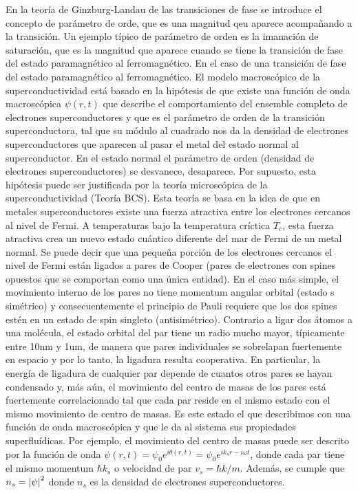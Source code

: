 En la teoría de Ginzburg-Landau de las transiciones de fase se introduce el concepto de parámetro de orde, que es una magnitud qeu aparece acompañando a la transición. Un ejemplo típico de parámetro de orden es la imanación de saturación, que es la magnitud que aparece cuando se tiene la transición de fase del estado paramagnético al ferromagnético. En el caso de una transición de fase del estado paramagnético al ferromagnético. El modelo macroscópico de la superconductividad está basado en la hipótesis de que existe una función de onda macroscópica $\psi(r,t)$ que describe el comportamiento del ensemble completo de electrones superconductores y que es el parámetro de orden de la transición superconductora, tal que su módulo al cuadrado nos da la densidad de electrones superconductores que aparecen al pasar el metal del estado normal al superconductor. En el estado normal el parámetro de orden (densidad de electrones superconductores) se desvanece, desaparece. Por supuesto, esta hipótesis puede ser justificada por la teoría microscópica de la superconductividad (Teoría BCS). Esta teoría se basa en la idea de que en metales superconductores existe una fuerza atractiva entre los electrones cercanos al nivel de Fermi. A temperaturas bajo la temperatura críctica $T_c$, esta fuerza atractiva crea un nuevo estado cuántico diferente del mar de Fermi de un metal normal. Se puede decir que una pequeña porción de los electrones cercanos el nivel de Fermi están ligados a pares de Cooper (pares de electrones con spines opuestos que se comportan como una única entidad). En el caso más simple, el movimiento interno de los pares no tiene momentum angular orbital (estado s simétrico) y consecuentemente el principio de Pauli requiere que los dos spines estén en un estado de spin singleto (antisimétrico). Contrario a ligar dos átomos a una molécula, el estado orbital del par tiene un radio mucho mayor, típicamente entre 10nm y 1um, de manera que pares individuales se sobrelapan fuertemente en espacio y por lo tanto, la ligadura resulta cooperativa. En particular, la energía de ligadura de cualquier par depende de cuantos otros pares se hayan condensado y, más aún, el movimiento del centro de masas de los pares está fuertemente correlacionado tal que cada par reside en el mismo estado con el mismo movimiento de centro de masas. Es este estado el que describimos con una función de onda macroscópica y que le da al sistema sus propiedades superfluídicas. Por ejemplo, el movimiento del centro de masas puede ser descrito por la función de onda $\psi(r,t) = \psi_0 e^{i \theta(r,t)} = \psi_0 e^{i k_s \dot r - i \omega t}$, donde cada par tiene el mismo momentum $\hbar k_s$ o velocidad de par $v_s = \hbar k/m$. Además, se cumple que $n_s = \abs{\psi}^2$ donde $n_s$ es la densidad de electrones superconductores.

